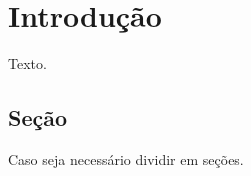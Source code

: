 \chapter{Introdução} \label{chapter:introducao}

Texto.

\section{Seção} \label{section:sec1}

Caso seja necessário dividir em seções.